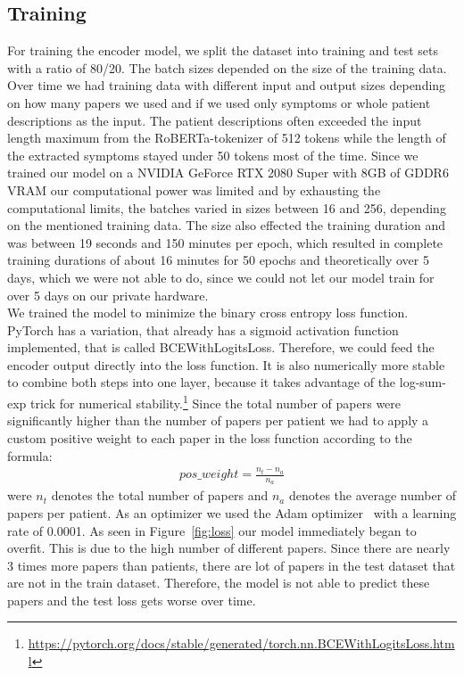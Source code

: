 \subsection{Training}
For training the encoder model, we split the dataset into training and test sets with a ratio of 80/20. The batch sizes depended on the size of the training data. Over time we had training data with different input and output sizes depending on how many papers we used and if we used only symptoms or whole patient descriptions as the input. The patient descriptions often exceeded the input length maximum from the RoBERTa-tokenizer of 512 tokens while the length of the extracted symptoms stayed under 50 tokens most of the time. Since we trained our model on a NVIDIA GeForce RTX 2080 Super with 8GB of GDDR6 VRAM our computational power was limited and by exhausting the computational limits, the batches varied in sizes between 16 and 256, depending on the mentioned training data. The size also effected the training duration and was between 19 seconds and 150 minutes per epoch, which resulted in complete training durations of about 16 minutes for 50 epochs and theoretically over 5 days, which we were not able to do, since we could not let our model train for over 5 days on our private hardware.\\
We trained the model to minimize the binary cross entropy loss function. PyTorch has a variation, that already has a sigmoid activation function implemented, that is called BCEWithLogitsLoss. Therefore, we could feed the encoder output directly into the loss function. It is also numerically more stable to combine both steps into one layer, because it takes advantage of the log-sum-exp trick for numerical stability.\footnote{\url{https://pytorch.org/docs/stable/generated/torch.nn.BCEWithLogitsLoss.html}} Since the total number of papers were significantly higher than the number of papers per patient we had to apply a custom positive weight to each paper in the loss function according to the formula:
\begin{align*}
    pos\_weight = \frac{n_t - n_a}{n_a}
\end{align*}
were $n_t$ denotes the total number of papers and $n_a$ denotes the average number of papers per patient.
As an optimizer we used the Adam optimizer~\cite{diederik2014adam} with a learning rate of 0.0001. As seen in Figure~\ref{fig:loss} our model immediately began to overfit. This is due to the high number of different papers. Since there are nearly 3 times more papers than patients, there are lot of papers in the test dataset that are not in the train dataset. Therefore, the model is not able to predict these papers and the test loss gets worse over time.

